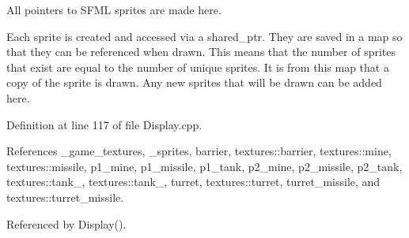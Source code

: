 All pointers to S\-F\-M\-L sprites are made here. 

Each sprite is created and accessed via a shared\-\_\-ptr. They are saved in a map so that they can be referenced when drawn. This means that the number of sprites that exist are equal to the number of unique sprites. It is from this map that a copy of the sprite is drawn. Any new sprites that will be drawn can be added here. 

Definition at line 117 of file Display.\-cpp.



References \-\_\-game\-\_\-textures, \-\_\-sprites, barrier, textures\-::barrier, textures\-::mine, textures\-::missile, p1\-\_\-mine, p1\-\_\-missile, p1\-\_\-tank, p2\-\_\-mine, p2\-\_\-missile, p2\-\_\-tank, textures\-::tank\-\_, textures\-::tank\-\_, turret, textures\-::turret, turret\-\_\-missile, and textures\-::turret\-\_\-missile.



Referenced by Display().


